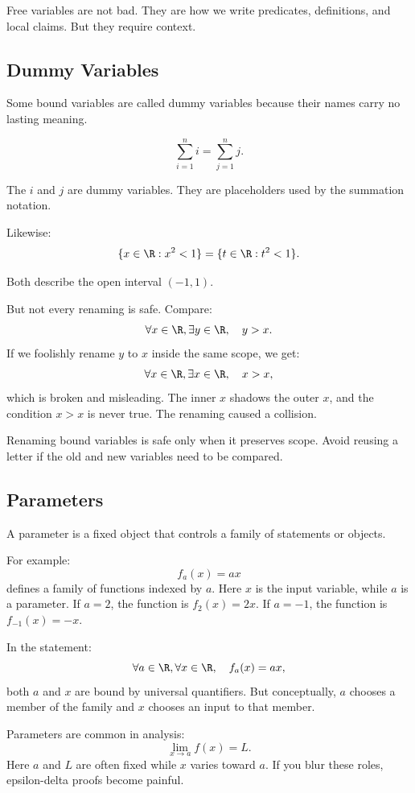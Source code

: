 Free variables are not bad. They are how we write predicates, definitions, and local claims. But they require context.

\subsection{Dummy Variables}

Some bound variables are called dummy variables because their names carry no lasting meaning.

\[
\sum_{i=1}^{n} i
=
\sum_{j=1}^{n} j.
\]

The $i$ and $j$ are dummy variables. They are placeholders used by the summation notation.

Likewise:
\[
\{x\in\R:x^2<1\}
=
\{t\in\R:t^2<1\}.
\]

Both describe the open interval $(-1,1)$.

But not every renaming is safe. Compare:
\[
\forall x\in\R,\exists y\in\R,\quad y>x.
\]
If we foolishly rename $y$ to $x$ inside the same scope, we get:
\[
\forall x\in\R,\exists x\in\R,\quad x>x,
\]
which is broken and misleading. The inner $x$ shadows the outer $x$, and the condition $x>x$ is never true. The renaming caused a collision.

\begin{trapbox}
Renaming bound variables is safe only when it preserves scope. Avoid reusing a letter if the old and new variables need to be compared.
\end{trapbox}

\subsection{Parameters}

A parameter is a fixed object that controls a family of statements or objects.

For example:
\[
f_a(x)=ax
\]
defines a family of functions indexed by $a$. Here $x$ is the input variable, while $a$ is a parameter. If $a=2$, the function is $f_2(x)=2x$. If $a=-1$, the function is $f_{-1}(x)=-x$.

In the statement:
\[
\forall a\in\R,\forall x\in\R,\quad f_a(x)=ax,
\]
both $a$ and $x$ are bound by universal quantifiers. But conceptually, $a$ chooses a member of the family and $x$ chooses an input to that member.

Parameters are common in analysis:
\[
\lim_{x\to a} f(x)=L.
\]
Here $a$ and $L$ are often fixed while $x$ varies toward $a$. If you blur these roles, epsilon-delta proofs become painful.

